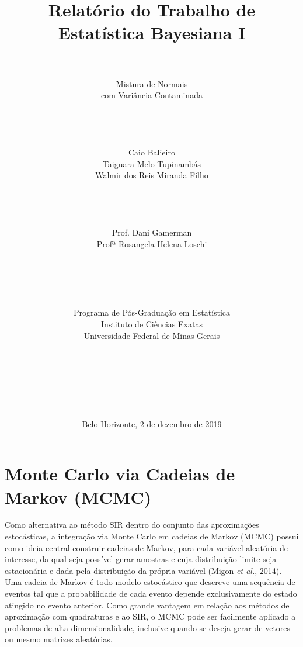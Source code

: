 \documentclass[12pt,reqno,a4paper,oneside]{article}
\begin{document}
\title{\huge Relatório do Trabalho de\\
	Estatística Bayesiana I}
\author{\\
	\\
	\huge Mistura de Normais\\
	\huge com Variância Contaminada\\
	\\
	\\
	\\
	\\
	\Large Caio Balieiro\\
	\Large Taiguara Melo Tupinambás\\
	\Large Walmir dos Reis Miranda Filho\\
	\\
	\\
	\\
	\\
	\Large Prof. Dani Gamerman\\
	\Large Profª Rosangela Helena Loschi\\
	\\
	\\
	\\
	\\
	\\
	Programa de Pós-Graduação em Estatística\\
	Instituto de Ciências Exatas\\
	Universidade Federal de Minas Gerais\\
	\\
	\\
	\\
	\\
	\\
	\\}
\date{Belo Horizonte, 2 de dezembro de 2019}
\maketitle

\newpage





\section{Monte Carlo via Cadeias de Markov (MCMC)}\label{mcmc}

Como alternativa ao método SIR dentro do conjunto das aproximações estocásticas, a integração via Monte Carlo em cadeias de Markov (MCMC) possui como ideia central construir cadeias de Markov, para cada variável aleatória de interesse, da qual seja possível gerar amostras e cuja distribuição limite seja estacionária e dada pela distribuição da própria variável (Migon \textit{et al.}, 2014)\cite{MiGaLou2014}. Uma cadeia de Markov é todo modelo estocástico que descreve uma sequência de eventos tal que a probabilidade de cada evento depende exclusivamente do estado atingido no evento anterior. Como grande vantagem em relação aos métodos de aproximação com quadraturas e ao SIR, o MCMC pode ser facilmente aplicado a problemas de alta dimensionalidade, inclusive quando se deseja gerar de vetores ou mesmo matrizes aleatórias.
\end{document}

